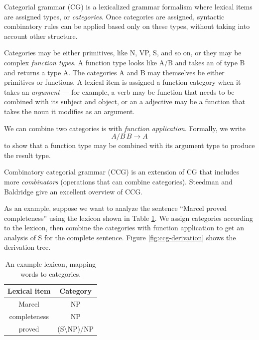 \documentclass{article}
\begin{document}

Categorial grammar (CG) \cite{cg,bar-hillel-cg} is a lexicalized grammar formalism where lexical items are assigned types, or {\em categories}. Once categories are assigned, syntactic combinatory rules can be applied based only on these types, without taking into account other structure.

Categories may be either primitives, like N, VP, S, and so on, or they may be complex {\em function types}. A function type looks like A/B and takes an of type B and returns a type A. The categories A and B may themselves be either primitives or functions. A lexical item is assigned a function category when it takes an {\em argument} --- for example, a verb may be function that needs to be combined with its subject and object, or an a adjective may be a function that takes the noun it modifies as an argument.

We can combine two categories is with {\em function application}. Formally, we write
\begin{equation}
A/B \, B \to A \label{eqn:forward-app}
\end{equation}
to show that a function type may be combined with its argument type to produce the result type.

Combinatory categorial grammar (CCG) is an extension of CG that includes more {\em combinators} (operations that can combine categories). Steedman and Baldridge  give an excellent overview of CCG.

As an example, suppose we want to analyze the sentence ``Marcel proved completeness'' using the lexicon shown in Table \ref{table:lexicon}. We assign categories according to the lexicon, then combine the categories with function application to get an analysis of S for the complete sentence. Figure \ref{fig:ccg-derivation} shows the derivation tree.

\begin{table}
\centering
\begin{tabular}{|c|c|}
\hline
Lexical item & Category \\
\hline
Marcel & NP \\
completeness & NP \\
proved & (S\textbackslash NP)/NP \\
\hline
\end{tabular}
\caption{An example lexicon, mapping words to categories.\label{table:lexicon}}
\end{table}
\end{document}
